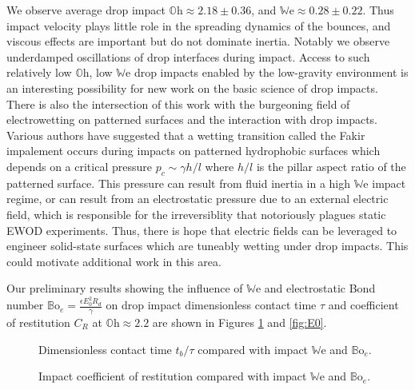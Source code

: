\documentclass[12pt,a4paper,oneside]{book}
\begin{document}
We observe average drop impact $\mathbb{O}\mbox{h} \approx 2.18 \pm 0.36$, and  $\mathbb{W}\mbox{e} \approx 0.28 \pm 0.22$. Thus impact velocity plays little role in the spreading dynamics of the bounces, and viscous effects are important but do not dominate inertia. Notably we observe underdamped oscillations of drop interfaces during impact. Access to such relatively low $\mathbb{O}\mbox{h}$, low $\mathbb{W}\mbox{e}$ drop impacts enabled by the low-gravity environment is an interesting possibility for new work on the basic science of drop impacts. There is also the intersection of this work with the burgeoning field of electrowetting on patterned surfaces and the interaction with drop impacts. Various authors\cite{bartolo_bouncing_2006, reyssat_bouncing_2006} have suggested that a wetting transition called the Fakir impalement occurs during impacts on patterned hydrophobic surfaces which depends on a critical pressure $p_c \sim \gamma h/l$ where $h/l$ is the pillar aspect ratio of the patterned surface. This pressure can result from fluid inertia in a high $\mathbb{W}\mbox{e}$ impact regime, or can result from an electrostatic pressure due to an external electric field, which is responsible for the irreversiblity that notoriously plagues static EWOD experiments. Thus, there is hope that electric fields can be leveraged to engineer solid-state surfaces which are tuneably wetting under drop impacts. This could motivate additional work in this area.
 
Our preliminary results showing the influence of $\mathbb{W}\mbox{e}$ and electrostatic Bond number $\mathbb{B}\mbox{o}_e = \frac{\epsilon E_0^2 R_d}{\gamma} $ on drop impact dimensionless contact time $\tau$ and coefficient of restitution $C_R$ at $\mathbb{O}\mbox{h} \approx 2.2$ are shown in Figures \ref{fig:contact} and \ref{fig:E0}.

\begin{figure}[htb]
    \centering
    
    \caption{Dimensionless contact time $t_b/\tau$ compared with impact $\mathbb{W}\mbox{e}$ and $\mathbb{B}\mbox{o}_e$.\label{fig:contact}}
\end{figure}

\begin{figure}[htb]
    \centering
    
    \caption{Impact coefficient of restitution compared with impact $\mathbb{W}\mbox{e}$ and $\mathbb{B}\mbox{o}_e$.\label{fig:restitution}}
\end{figure}
\end{document}
